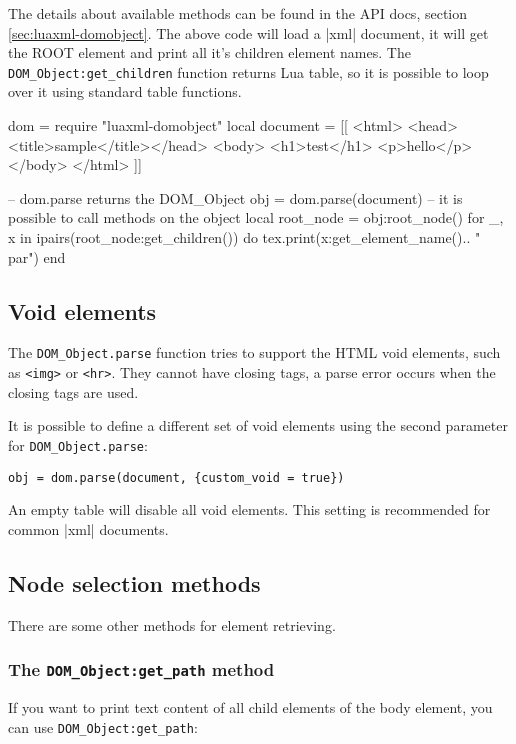 \documentclass{ltxdoc}
\begin{document}
The details about available methods can be found in the API docs, section
\ref{sec:luaxml-domobject}. The above code will load a |xml| document, it will
get the ROOT element and print all it's children element names.  The
\verb|DOM_Object:get_children| function returns Lua table, so it is possible to
loop over it using standard table functions.

\begin{framed}
\begin{luacode*}
dom = require "luaxml-domobject"
local document = [[
<html>
<head><title>sample</title></head>
<body>
<h1>test</h1>
<p>hello</p>
</body>
</html>
  ]]

-- dom.parse returns the DOM_Object
obj = dom.parse(document)
-- it is possible to call methods on the object
local root_node = obj:root_node()
for _, x in ipairs(root_node:get_children()) do
  tex.print(x:get_element_name().. "\\par")
end
\end{luacode*}
\end{framed}

\subsection{Void elements}

The \verb|DOM_Object.parse| function tries to support the HTML void elements,
such as \verb|<img>| or \verb|<hr>|. They cannot have closing tags, a parse
error occurs when the closing tags are used.

It is possible to define a different set of void elements using the second parameter 
for \verb|DOM_Object.parse|:

\begin{verbatim}
obj = dom.parse(document, {custom_void = true})
\end{verbatim}

An empty table will disable all void elements. This setting is recommended for common |xml| documents.


\subsection{Node selection methods}
There are some other methods for element retrieving. 

\subsubsection{The \texttt{DOM\_Object:get\_path} method}
If you want to print text content of all child elements of the body element, you can use \verb|DOM_Object:get_path|:
\end{document}
